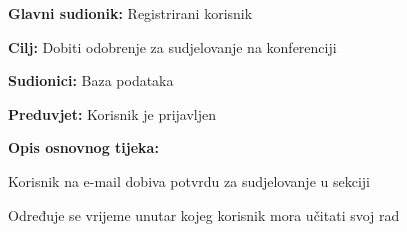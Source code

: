 	\noindent {}
	\begin{packed_item}
		
		\item \textbf{Glavni sudionik: }Registrirani korisnik
		\item  \textbf{Cilj:} Dobiti odobrenje za sudjelovanje na konferenciji
		\item  \textbf{Sudionici:} Baza podataka
		\item  \textbf{Preduvjet:} Korisnik je prijavljen
		\item  \textbf{Opis osnovnog tijeka:}
		
		\item[] \begin{packed_enum}
			
			\item  Korisnik na e-mail dobiva potvrdu za sudjelovanje u sekciji
			\item Određuje se vrijeme unutar kojeg korisnik mora učitati svoj rad
			
		\end{packed_enum}
	\end{packed_item}


